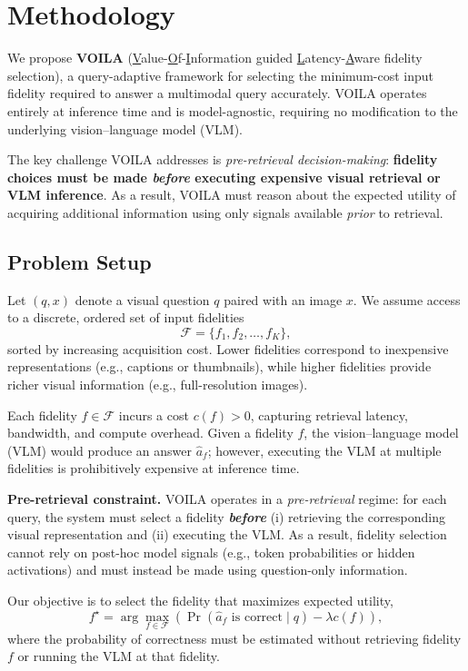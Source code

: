 \section{Methodology}\label{sec:method}

We propose \textbf{VOILA} (\underline{V}alue-\underline{O}f-\underline{I}nformation guided \underline{L}atency-\underline{A}ware fidelity selection), a query-adaptive framework for selecting the minimum-cost input fidelity required to answer a multimodal query accurately. VOILA operates entirely at inference time and is model-agnostic, requiring no modification to the underlying vision--language model (VLM).

The key challenge VOILA addresses is \emph{pre-retrieval decision-making}: \textbf{fidelity choices must be made \emph{before} executing expensive visual retrieval or VLM inference}.
As a result, VOILA must reason about the expected utility of acquiring additional information using only signals available \emph{prior} to retrieval.

\subsection{Problem Setup}
\label{sec:problem_setup}

Let $(q, x)$ denote a visual question $q$ paired with an image $x$.
We assume access to a discrete, ordered set of input fidelities
\[
\mathcal{F} = \{f_1, f_2, \dots, f_K\},
\]
sorted by increasing acquisition cost.
Lower fidelities correspond to inexpensive representations (e.g., captions or thumbnails),
while higher fidelities provide richer visual information (e.g., full-resolution images).

Each fidelity $f \in \mathcal{F}$ incurs a cost $c(f) > 0$, capturing retrieval latency,
bandwidth, and compute overhead.
Given a fidelity $f$, the vision--language model (VLM) would produce an answer
$\hat{a}_f$; however, executing the VLM at multiple fidelities is prohibitively expensive at inference time.

\textbf{Pre-retrieval constraint.}
VOILA operates in a \emph{pre-retrieval} regime:
for each query, the system must select a fidelity \textbf{\emph{before}} (i) retrieving the
corresponding visual representation and (ii) executing the VLM.
As a result, fidelity selection cannot rely on post-hoc model signals
(e.g., token probabilities or hidden activations) and must instead be made using
question-only information.

Our objective is to select the fidelity that maximizes expected utility,
\[
f^\star
=
\arg\max_{f \in \mathcal{F}}
\left(
\Pr(\hat{a}_f \text{ is correct} \mid q) - \lambda c(f)
\right),
\]
where the probability of correctness must be estimated without retrieving fidelity $f$
or running the VLM at that fidelity.




